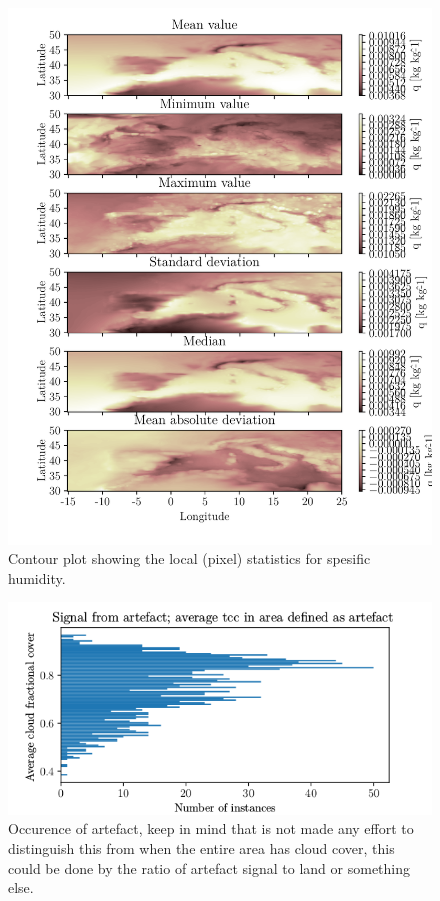 \begin{figure}[ht]
    \centering
    \includegraphics{python_figs/all_stat_variable_q.pdf}
    \caption{Contour plot showing the local (pixel) statistics for spesific humidity.}
    \label{fig:all_stats_q}
\end{figure}


\begin{figure}
    \centering
    \includegraphics{python_figs/signal_artefact.png}
    \caption{Occurence of artefact, keep in mind that is not made any effort to distinguish this from when the entire area has cloud cover, this could be done by the ratio of artefact signal to land or something else. }
    \label{fig:signal_artefact}
\end{figure}


